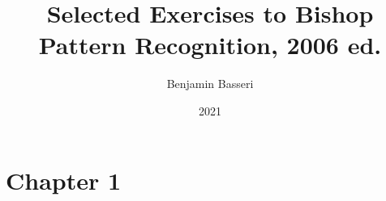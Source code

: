 \documentclass{article}
\title{Selected Exercises to Bishop Pattern Recognition, 2006 ed.}
\author{Benjamin Basseri}
\begin{document}
\date{2021}
\maketitle


\section{Chapter 1}

\end{document}
